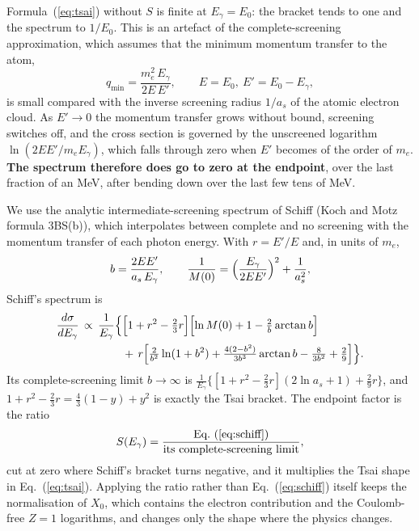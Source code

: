 \documentclass[11pt,a4paper]{article}
\newcommand{\Eg}{E_\gamma}
\begin{document}
Formula~(\ref{eq:tsai}) without $S$ is finite at $\Eg=E_0$: the bracket tends to one and the spectrum
to $1/E_0$.  This is an artefact of the complete-screening approximation, which assumes that the
minimum momentum transfer to the atom,
\begin{equation}
q_{\min}=\frac{m_e^2\,\Eg}{2E\,E'},\qquad E=E_0,\ E'=E_0-\Eg,
\end{equation}
is small compared with the inverse screening radius $1/a_s$ of the atomic electron cloud.  As
$E'\to0$ the momentum transfer grows without bound, screening switches off, and the cross section is
governed by the unscreened logarithm $\ln(2EE'/m_e\Eg)$, which falls through zero when $E'$ becomes of
the order of $m_e$.  \textbf{The spectrum therefore does go to zero at the endpoint}, over the last
fraction of an MeV, after bending down over the last few tens of MeV.

We use the analytic intermediate-screening spectrum of Schiff (Koch and Motz formula 3BS(b)), which
interpolates between complete and no screening with the momentum transfer of each photon energy.  With
$r=E'/E$ and, in units of $m_e$,
\begin{equation}
b=\frac{2EE'}{a_s\,\Eg},\qquad
\frac{1}{M(0)}=\Bigl(\frac{\Eg}{2EE'}\Bigr)^2+\frac{1}{a_s^2},
\end{equation}
Schiff's spectrum is
\begin{align}
\frac{d\sigma}{d\Eg}\,\propto\,\frac{1}{\Eg}\Bigl\{&
\Bigl[1+r^2-\tfrac23 r\Bigr]\Bigl[\ln M(0)+1-\tfrac{2}{b}\arctan b\Bigr]\nonumber\\
&+\,r\Bigl[\tfrac{2}{b^2}\ln(1+b^2)+\tfrac{4(2-b^2)}{3b^3}\arctan b-\tfrac{8}{3b^2}+\tfrac29\Bigr]\Bigr\}.
\label{eq:schiff}
\end{align}
Its complete-screening limit $b\to\infty$ is $\frac1{\Eg}\{[1+r^2-\frac23 r](2\ln a_s+1)+\frac29 r\}$,
and $1+r^2-\frac23 r=\frac43(1-y)+y^2$ is exactly the Tsai bracket.  The endpoint factor is the ratio
\begin{equation}
S(\Eg)=\frac{\text{Eq.~(\ref{eq:schiff})}}{\text{its complete-screening limit}},
\end{equation}
cut at zero where Schiff's bracket turns negative, and it multiplies the Tsai shape in
Eq.~(\ref{eq:tsai}).  Applying the ratio rather than Eq.~(\ref{eq:schiff}) itself keeps the
normalisation of $X_0$, which contains the electron contribution and the Coulomb-free $Z=1$
logarithms, and changes only the shape where the physics changes.
\end{document}
